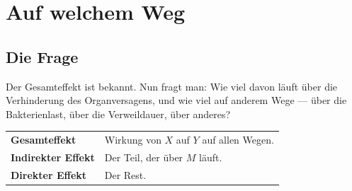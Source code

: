 \chapter{Auf welchem Weg}

\section{Die Frage}

\begin{merksatz}
Der Gesamteffekt ist bekannt. Nun fragt man: Wie viel davon läuft über die Verhinderung des Organversagens, und wie viel auf anderem Wege --- über die Bakterienlast, über die Verweildauer, über anderes?

\begin{center}
{\small
\renewcommand{\arraystretch}{1.55}
\begin{tabular}{@{}P{2.6cm}P{6.0cm}@{}}
\toprule
\textbf{Gesamteffekt} & Wirkung von $X$ auf $Y$ auf allen Wegen.\\
\textbf{Indirekter Effekt} & Der Teil, der über $M$ läuft.\\
\textbf{Direkter Effekt} & Der Rest.\\
\bottomrule
\end{tabular}}
\end{center}

\begin{center}
\begin{minipage}{0.88\textwidth}
\end{minipage}
\end{center}
\end{merksatz}

